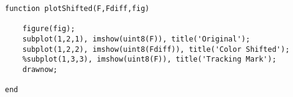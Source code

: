 \begin{verbatim}
function plotShifted(F,Fdiff,fig)

    figure(fig);
    subplot(1,2,1), imshow(uint8(F)), title('Original');
    subplot(1,2,2), imshow(uint8(Fdiff)), title('Color Shifted');
    %subplot(1,3,3), imshow(uint8(F)), title('Tracking Mark');
    drawnow;

end
\end{verbatim}